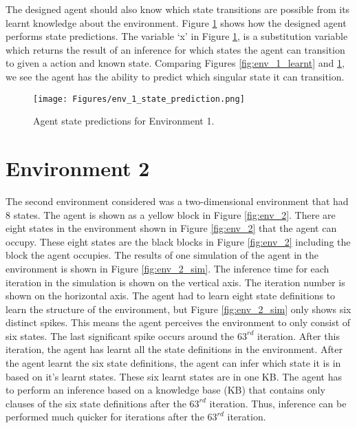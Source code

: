 The designed agent should also know which state transitions are possible from its learnt knowledge about the environment. Figure \ref{fig:env_1_predict} shows how the designed agent performs state predictions. The variable `x' in Figure \ref{fig:env_1_predict}, is a substitution variable which returns the result of an inference for which states the agent can transition to given a action and known state. Comparing Figures \ref{fig:env_1_learnt} and \ref{fig:env_1_predict}, we see the agent has the ability to predict which singular state it can transition.

\begin{figure}[H]
    \centering
    \texttt{[image: Figures/env\_1\_state\_prediction.png]}
    \caption{Agent state predictions for Environment 1.}
    \label{fig:env_1_predict}
\end{figure}




\section{Environment 2}
\label{subsec:env_2}

The second environment considered was a two-dimensional environment that had 8 states. The agent is shown as a yellow block in Figure \ref{fig:env_2}. There are eight states in the environment shown in Figure \ref{fig:env_2} that the agent can occupy. These eight states are the black blocks in Figure \ref{fig:env_2} including the block the agent occupies.
The results of one simulation of the agent in the environment is shown in Figure \ref{fig:env_2_sim}. The inference time for each iteration in the simulation is shown on the vertical axis. The iteration number is shown on the horizontal axis. The agent had to learn eight state definitions to learn the structure of the environment, but Figure \ref{fig:env_2_sim} only shows six distinct spikes. This means the agent perceives the environment to only consist of six states. The last significant spike occurs around the $63^{rd}$ iteration. After this iteration, the agent has learnt all the state definitions in the environment. After the agent learnt the six state definitions, the agent can infer which state it is in based on it's learnt states.
These six learnt states are in one KB. The agent has to perform an inference based on a knowledge base (KB) that contains only clauses of the six state definitions after the $63^{rd}$ iteration. Thus, inference can be performed much quicker for iterations after the $63^{rd}$ iteration.



